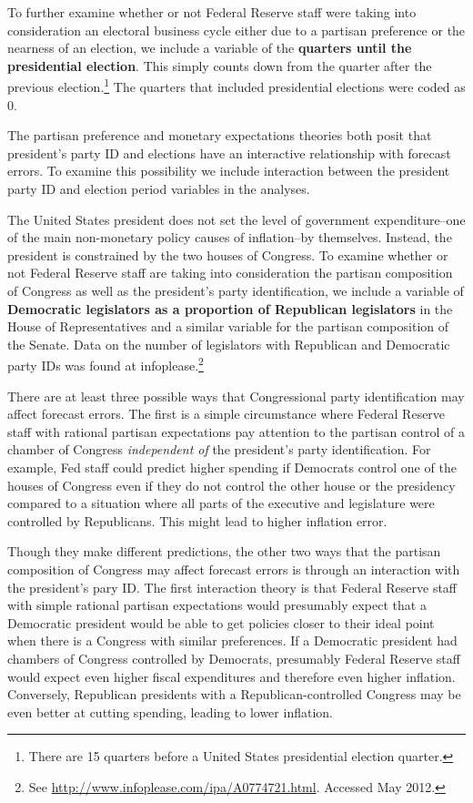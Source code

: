 \documentclass[a4paper]{article}\usepackage{graphicx, color}
\begin{document}
To further examine whether or not Federal Reserve staff were taking into consideration an electoral business cycle either due to a partisan preference or the nearness of an election, we include a variable of the {\bf{quarters until the presidential election}}. This simply counts down from the quarter after the previous election.\footnote{There are 15 quarters before a United States presidential election quarter.} The quarters that included presidential elections were coded as 0. 

The partisan preference and monetary expectations theories both posit that president's party ID and elections have an interactive relationship with forecast errors. To examine this possibility we include interaction between the president party ID and election period variables in the analyses.

The United States president does not set the level of government expenditure--one of the main non-monetary policy causes of inflation--by themselves. Instead, the president is constrained by the two houses of Congress. To examine whether or not Federal Reserve staff are taking into consideration the partisan composition of Congress as well as the president's party identification, we include a variable of {\bf{Democratic legislators as a proportion of Republican legislators}} in the House of Representatives and a similar variable for the partisan composition of the Senate. Data on the number of legislators with Republican and Democratic party IDs was found at infoplease.\footnote{See {\url{http://www.infoplease.com/ipa/A0774721.html}}. Accessed May 2012.} 

There are at least three possible ways that Congressional party identification may affect forecast errors. The first is a simple circumstance where Federal Reserve staff with rational partisan expectations pay attention to the partisan control of a chamber of Congress {\emph{independent of}} the president's party identification.  For example, Fed staff could predict higher spending if Democrats control one of the houses of Congress even if they do not control the other house or the presidency compared to a situation where all parts of the executive and legislature were controlled by Republicans. This might lead to higher inflation error.

Though they make different predictions, the other two ways that the partisan composition of Congress may affect forecast errors is through an interaction with the president's pary ID. The first interaction theory is that Federal Reserve staff with simple rational partisan expectations would presumably expect that a Democratic president would be able to get policies closer to their ideal point when there is a Congress with similar preferences. If a Democratic president had chambers of Congress controlled by Democrats, presumably Federal Reserve staff would expect even higher fiscal expenditures and therefore even higher inflation. Conversely, Republican presidents with a Republican-controlled Congress may be even better at cutting spending, leading to lower inflation.
\end{document}
